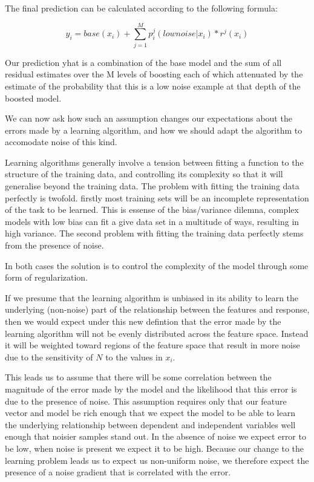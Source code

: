 \documentclass[11pt,twoside,a4paper]{article}
\begin{document}
The final prediction can be calculated according to the following formula:

\begin{equation}
\hat{y}_i = base(x_i) + \sum_{j=1}^M p_i^j(low noise | x_i) * r^j(x_i)
\label{eq:pred}
\end{equation}
 

Our prediction yhat is a combination of the base model and the sum of all residual estimates over the M levels of boosting
each of which attenuated by the estimate of the probability that this is a low noise example at that depth of the boosted 
model. 



We can now ask how such an assumption changes our expectations about the errors made by a
learning algorithm, and how we should adapt the algorithm to accomodate noise of this kind.

Learning algorithms generally involve a tension between fitting a function to the structure of
the training data, and controlling its complexity so that it will generalise beyond the training
data. The problem with fitting the training data perfectly is twofold. firstly most training sets
will be an incomplete representation of the task to be learned. This is essense of the bias/variance
dilemna, complex models with low bias can fit a give data set in a multitude of ways, resulting in
high variance. The second problem with fitting the training data perfectly stems from the presence of noise.

In both cases the solution is to control the complexity of the model through some form of regularization.

If we presume that the learning algorithm is unbiased in its ability to learn the underlying
(non-noise) part of the relationship between the features and response, then we would expect
under this new defintion that the error made by the learning algorithm will not be evenly 
distributed across the feature space. Instead it will be weighted toward regions of the feature
space that result in more noise due to the sensitivity of $N$ to the values in $x_i$.

This leads us to assume that there will be some correlation between the magnitude of the error made
by the model and the likelihood that this error is due to the presence of noise. 
This assumption requires only that our feature vector and model be rich enough that we expect the 
model to be able to learn the underlying relationship between dependent and independent variables 
well enough that noisier samples stand out. In the absence of noise we expect error to be low, 
when noise is present we expect it to be high. Because our change to the learning problem leads us
to expect us non-uniform noise, we therefore expect the presence of a noise gradient that is correlated with the error.
\end{document}
